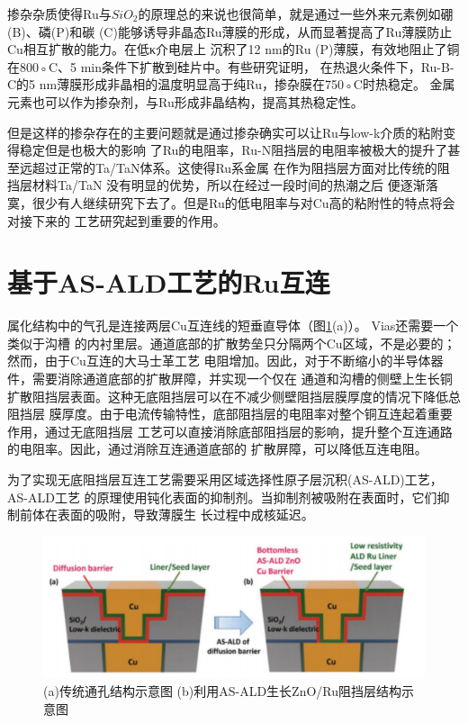 \documentclass[UTF8,a4paper,12pt]{ctexart}%
\begin{document}
掺杂杂质使得Ru与$SiO_2$的原理总的来说也很简单，就是通过一些外来元素例如硼(B)、磷(P)和碳
(C)能够诱导非晶态Ru薄膜的形成，从而显著提高了Ru薄膜防止Cu相互扩散的能力。在低κ介电层上
沉积了12 nm的Ru (P)薄膜，有效地阻止了铜在800◦C、5 min条件下扩散到硅片中。有些研究证明，
在热退火条件下，Ru-B-C的5 nm薄膜形成非晶相的温度明显高于纯Ru，掺杂膜在750◦C时热稳定。
金属元素也可以作为掺杂剂，与Ru形成非晶结构，提高其热稳定性。


但是这样的掺杂存在的主要问题就是通过掺杂确实可以让Ru与low-k介质的粘附变得稳定但是也极大的影响
了Ru的电阻率，Ru-N阻挡层的电阻率被极大的提升了甚至远超过正常的Ta/TaN体系。这使得Ru系金属
在作为阻挡层方面对比传统的阻挡层材料Ta/TaN 没有明显的优势，所以在经过一段时间的热潮之后
便逐渐落寞，很少有人继续研究下去了。但是Ru的低电阻率与对Cu高的粘附性的特点将会对接下来的
工艺研究起到重要的作用。


\section{基于AS-ALD工艺的Ru互连}
属化结构中的气孔是连接两层Cu互连线的短垂直导体（图\ref{Fig:7}(a)）。 Vias还需要一个类似于沟槽
的内衬里层。通道底部的扩散势垒只分隔两个Cu区域，不是必要的；然而，由于Cu互连的大马士革工艺
电阻增加。因此，对于不断缩小的半导体器件，需要消除通道底部的扩散屏障，并实现一个仅在
通道和沟槽的侧壁上生长铜扩散阻挡层表面。这种无底阻挡层可以在不减少侧壁阻挡层膜厚度的情况下降低总阻挡层
膜厚度。由于电流传输特性，底部阻挡层的电阻率对整个铜互连起着重要作用，通过无底阻挡层
工艺可以直接消除底部阻挡层的影响，提升整个互连通路的电阻率。因此，通过消除互连通道底部的
扩散屏障，可以降低互连电阻。


为了实现无底阻挡层互连工艺需要采用区域选择性原子层沉积(AS-ALD)工艺，AS-ALD工艺
的原理使用钝化表面的抑制剂。当抑制剂被吸附在表面时，它们抑制前体在表面的吸附，导致薄膜生
长过程中成核延迟。


\begin{figure}[htb]
	\centering
	\includegraphics[width=1\textwidth]{7.jpg}
	\caption{(a)传统通孔结构示意图 (b)利用AS-ALD生长ZnO/Ru阻挡层结构示意图}
	\label{Fig:7}
\end{figure}
\end{document}
